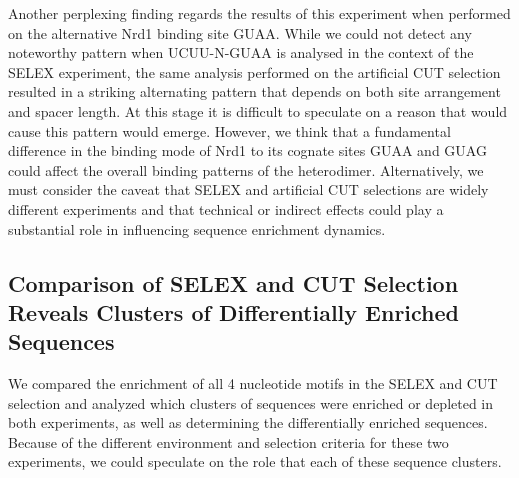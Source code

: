 Another perplexing finding regards the results of this experiment when performed on the alternative Nrd1 binding site GUAA. While we could not detect any noteworthy pattern when UCUU-N-GUAA is analysed in the context of the SELEX experiment, the same analysis performed on the artificial CUT selection resulted in a striking alternating pattern that depends on both site arrangement and spacer length. At this stage it is difficult to speculate on a reason that would cause this pattern would emerge. However, we think that a fundamental difference in the binding mode of Nrd1 to its cognate sites GUAA and GUAG could affect the overall binding patterns of the heterodimer. Alternatively, we must consider the caveat that SELEX and artificial CUT selections are widely different experiments and that technical or indirect effects could play a substantial role in influencing sequence enrichment dynamics. 

\singlespacing
\subsection{Comparison of SELEX and \invivo{} CUT Selection Reveals Clusters of Differentially Enriched Sequences}
\doublespacing

We compared the enrichment of all 4 nucleotide motifs in the SELEX and \invivo{} CUT selection and analyzed which clusters of sequences were enriched or depleted in both experiments, as well as determining the differentially enriched sequences. Because of the different environment and selection criteria for these two experiments, we could speculate on the role that each of these sequence clusters. 

